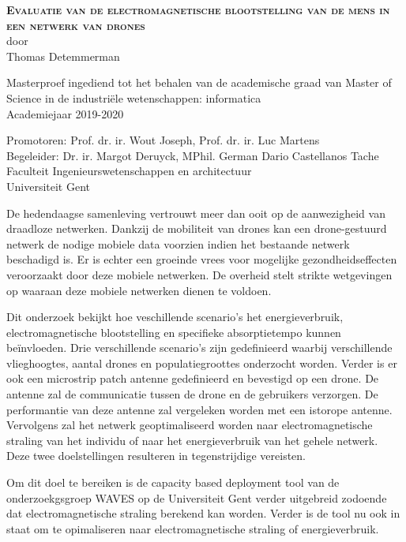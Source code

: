 \begin{center}
\textsc{\textbf{\Huge Evaluatie van de electromagnetische blootstelling van de mens in een netwerk van drones}}\\

door\\
Thomas Detemmerman

Masterproef ingediend tot het behalen van de academische graad van Master of Science in de
industri\"ele wetenschappen: informatica\\
Academiejaar 2019-2020

Promotoren: Prof. dr. ir. Wout Joseph, Prof. dr. ir. Luc Martens\\
Begeleider: Dr. ir. Margot Deruyck, MPhil. German Dario Castellanos Tache\\
Faculteit Ingenieurswetenschappen en architectuur\\
Universiteit Gent
\end{center}
De hedendaagse samenleving vertrouwt meer dan ooit op de aanwezigheid van draadloze netwerken. 
Dankzij de mobiliteit van  drones kan een drone-gestuurd netwerk de nodige mobiele data voorzien 
indien het bestaande netwerk beschadigd is.
Er is echter een groeinde vrees voor mogelijke gezondheidseffecten veroorzaakt door deze
mobiele netwerken. De overheid stelt strikte wetgevingen op waaraan deze mobiele netwerken dienen te voldoen.

Dit onderzoek bekijkt hoe veschillende scenario's het energieverbruik, electromagnetische blootstelling en 
specifieke absorptietempo kunnen be\"invloeden.
Drie verschillende scenario's zijn gedefinieerd waarbij verschillende vlieghoogtes, aantal drones en 
populatiegroottes onderzocht worden.
Verder is er ook een microstrip patch antenne gedefinieerd en bevestigd op een drone. 
De antenne zal de communicatie tussen de drone en de gebruikers verzorgen.
De performantie van deze antenne zal vergeleken worden met een istorope antenne.
Vervolgens zal het netwerk geoptimaliseerd worden naar electromagnetische straling van het individu of 
naar het energieverbruik van het gehele netwerk. Deze twee doelstellingen resulteren in 
tegenstrijdige vereisten. 

Om dit doel te bereiken is de capacity based deployment tool van de onderzoekgsgroep WAVES op de 
Universiteit Gent verder uitgebreid zodoende dat electromagnetische straling berekend kan worden.
Verder is de tool nu ook in staat om te opimaliseren naar electromagnetische straling of energieverbruik. 

